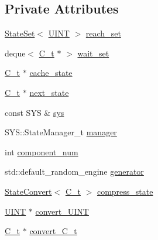 \subsection*{Private Attributes}
\begin{DoxyCompactItemize}
\item 
\mbox{\hyperlink{classgraphsat_1_1_state_set}{State\+Set}}$<$ \mbox{\hyperlink{namespacegraphsat_aa3b3d61a8c27ffc03448c5e1f3a76aed}{U\+I\+NT}} $>$ \mbox{\hyperlink{classgraphsat_1_1_reachable_set_a7270d49d5d00b07b2141049945ab9068}{reach\+\_\+set}}
\item 
deque$<$ \mbox{\hyperlink{classgraphsat_1_1_reachable_set_a0b7981a216ec4c46be913e08d5f0cd07}{C\+\_\+t}} $\ast$ $>$ \mbox{\hyperlink{classgraphsat_1_1_reachable_set_a54d45bcedcff957c97638a40b60277ea}{wait\+\_\+set}}
\item 
\mbox{\hyperlink{classgraphsat_1_1_reachable_set_a0b7981a216ec4c46be913e08d5f0cd07}{C\+\_\+t}} $\ast$ \mbox{\hyperlink{classgraphsat_1_1_reachable_set_a973d91fb3ba4a6f816da5635b4e4c17f}{cache\+\_\+state}}
\item 
\mbox{\hyperlink{classgraphsat_1_1_reachable_set_a0b7981a216ec4c46be913e08d5f0cd07}{C\+\_\+t}} $\ast$ \mbox{\hyperlink{classgraphsat_1_1_reachable_set_af630f815f7b5c3c99fa27de8adfd8752}{next\+\_\+state}}
\item 
const S\+YS \& \mbox{\hyperlink{classgraphsat_1_1_reachable_set_a8cd0c0375afff6bd2413505b49728ee4}{sys}}
\item 
S\+Y\+S\+::\+State\+Manager\+\_\+t \mbox{\hyperlink{classgraphsat_1_1_reachable_set_ac5af9eff47d342aa6fa133ca18b21d28}{manager}}
\item 
int \mbox{\hyperlink{classgraphsat_1_1_reachable_set_a6441fa7ce730a7f957fee673acf7c3d0}{component\+\_\+num}}
\item 
std\+::default\+\_\+random\+\_\+engine \mbox{\hyperlink{classgraphsat_1_1_reachable_set_a575a2267eaf24f34dd763a7526e48593}{generator}}
\item 
\mbox{\hyperlink{classgraphsat_1_1_state_convert}{State\+Convert}}$<$ \mbox{\hyperlink{classgraphsat_1_1_reachable_set_a0b7981a216ec4c46be913e08d5f0cd07}{C\+\_\+t}} $>$ \mbox{\hyperlink{classgraphsat_1_1_reachable_set_a87d3304d159d7cfe38c511d96087fbba}{compress\+\_\+state}}
\item 
\mbox{\hyperlink{namespacegraphsat_aa3b3d61a8c27ffc03448c5e1f3a76aed}{U\+I\+NT}} $\ast$ \mbox{\hyperlink{classgraphsat_1_1_reachable_set_a9a8099d17bf1671828dae5f46754fd62}{convert\+\_\+\+U\+I\+NT}}
\item 
\mbox{\hyperlink{classgraphsat_1_1_reachable_set_a0b7981a216ec4c46be913e08d5f0cd07}{C\+\_\+t}} $\ast$ \mbox{\hyperlink{classgraphsat_1_1_reachable_set_aabbc55808199927582d8e57a9232e498}{convert\+\_\+\+C\+\_\+t}}
\end{DoxyCompactItemize}
